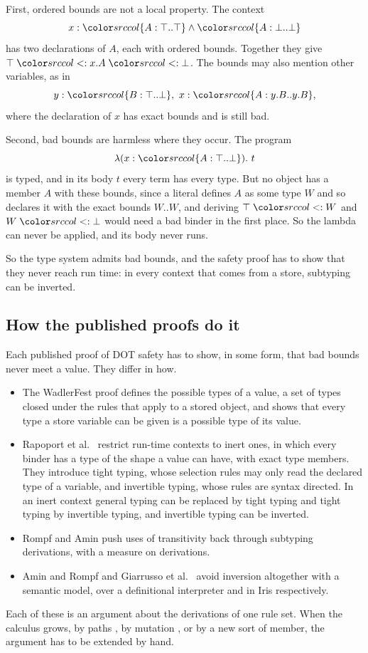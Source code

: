 First, ordered bounds are not a local property. The context
\[
x : \dtyp{A}{\top}{\top} \wedge \dtyp{A}{\bot}{\bot}
\]
has two declarations of $A$, each with ordered bounds. Together they give $\top \sub x.A \sub \bot$. The bounds may also mention other variables, as in
\[
y : \dtyp{B}{\top}{\bot},\ x : \dtyp{A}{y.B}{y.B} ,
\]
where the declaration of $x$ has exact bounds and is still bad.

Second, bad bounds are harmless where they occur. The program
\[
\lambda(x : \dtyp{A}{\top}{\bot}).\ t
\]
is typed, and in its body $t$ every term has every type. But no object has a member $A$ with these bounds, since a literal defines $A$ as some type $W$ and so declares it with the exact bounds $W..W$, and deriving $\top \sub W$ and $W \sub \bot$ would need a bad binder in the first place. So the lambda can never be applied, and its body never runs.

So the type system admits bad bounds, and the safety proof has to show that they never reach run time: in every context that comes from a store, subtyping can be inverted.

\subsection{How the published proofs do it}\label{sec:published}

Each published proof of DOT safety has to show, in some form, that bad bounds never meet a value. They differ in how.
\begin{itemize}
\item The WadlerFest proof \cite{amin2016essence} defines the possible types of a value, a set of types closed under the rules that apply to a stored object, and shows that every type a store variable can be given is a possible type of its value.
\item Rapoport et al.\ \cite{rapoport2017simple} restrict run-time contexts to inert ones, in which every binder has a type of the shape a value can have, with exact type members. They introduce tight typing, whose selection rules may only read the declared type of a variable, and invertible typing, whose rules are syntax directed. In an inert context general typing can be replaced by tight typing and tight typing by invertible typing, and invertible typing can be inverted.
\item Rompf and Amin \cite{rompf2016soundness} push uses of transitivity back through subtyping derivations, with a measure on derivations.
\item Amin and Rompf \cite{amin2017definitional} and Giarrusso et al.\ \cite{giarrusso2020scala} avoid inversion altogether with a semantic model, over a definitional interpreter and in Iris respectively.
\end{itemize}
Each of these is an argument about the derivations of one rule set. When the calculus grows, by paths \cite{rapoport2019path}, by mutation \cite{kabir2018kdot}, or by a new sort of member, the argument has to be extended by hand.


